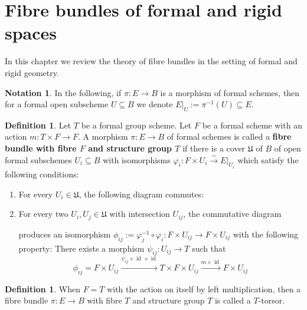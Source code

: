 \documentclass[10pt,oneside]{amsart}
\theoremstyle{definition}
\newtheorem{definition}[theorem]{Definition}
\newtheorem{notation}[theorem]{Notation}
\begin{document}
	
		\appendix
	\section{Fibre bundles of formal and rigid spaces}
	In this chapter we review the theory of fibre bundles in the setting of formal and rigid geometry.

	\begin{notation}
		In the following, if $\pi:E\rightarrow B$ is a morphism of formal schemes, then for a formal open subscheme $U\subseteq B$ we denote $E|_U:=\pi^{-1}(U)\subseteq E$.
	\end{notation}
	\begin{definition}\label{definition principal T-bundle}
		Let $T$ be a formal group scheme. Let $F$ be a formal scheme with an action $m:T\times F\rightarrow F$.
		A morphism $\pi:E\rightarrow B$ of formal schemes is called a \textbf{fibre bundle with fibre $F$ and structure group $T$} if there is a cover $\mathfrak U$ of $B$ of open formal subschemes $U_i\subseteq B$ with isomorphisms $\varphi_i:F\times U_i \xrightarrow{\sim} E|_{U_i}$ which satisfy the following conditions:
		\begin{enumerate}[label=(\alph*)]
			\item For every $U_i\in \mathfrak U$, the following diagram commutes:
			\begin{center}
			\end{center}
			\item For every two $U_i,U_j\in \mathfrak U$ with intersection $U_{ij}$, the commutative diagram
			\begin{center}
			\end{center}
			produces an isomorphism $\phi_{ij}:=\varphi_j^{-1}\circ\varphi_i: F\times U_{ij}\rightarrow F\times U_{ij}$ with the following property: There exists a morphism $\psi_{ij}:U_{ij}\rightarrow T$ such that
			\[\phi_{ij}=F\times U_{ij} \xrightarrow{\psi_{ij}\times \operatorname{id}\times\operatorname{id}} T\times F\times U_{ij}\xrightarrow{m\times \operatorname{id}} F\times U_{ij}\]
		\end{enumerate}
	\end{definition}
	\begin{definition}
		When $F=T$ with the action on itself by left multiplication, then a fibre bundle $\pi:E\rightarrow B$ with fibre $T$ and structure group $T$ is called a $T$-torsor.
	\end{definition}
	
\end{document}
